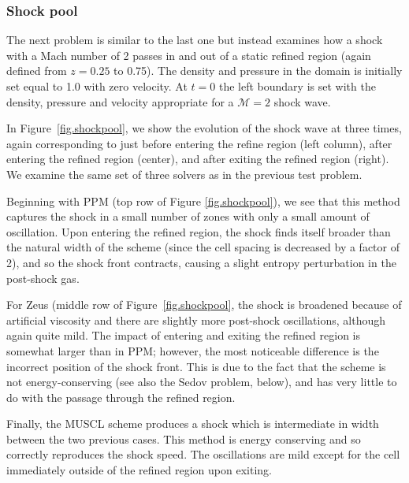 \subsubsection{Shock pool}
\label{sec.tests.shockpool}

The next problem is similar to the last one but instead examines how a shock with a Mach number of 2 passes in and out of a static refined region (again defined from $z=0.25$ to 0.75).  The density and pressure in the domain is initially set equal to 1.0 with zero velocity.  At $t=0$ the left boundary is set with the density, pressure and velocity appropriate for a $\mathcal{M}=2$ shock wave.

In Figure~\ref{fig.shockpool}, we show the evolution of the shock wave at three times, again corresponding to just before entering the refine region (left column), after entering the refined region (center), and after exiting the refined region (right).  We examine the same set of three solvers as in the previous test problem.

Beginning with PPM (top row of Figure \ref{fig.shockpool}), we see that this method captures the shock in a small number of zones with only a small amount of oscillation.  Upon entering the refined region, the shock finds itself broader than the natural width of the scheme (since the cell spacing is decreased by a factor of 2), and so the shock front contracts, causing a slight entropy perturbation in the post-shock gas. 

For Zeus (middle row of Figure~\ref{fig.shockpool}, the shock is broadened because of artificial viscosity and there are slightly more post-shock oscillations, although again quite mild.  The impact of entering and exiting the refined region is somewhat larger than in PPM; however, the most noticeable difference is the incorrect position of the shock front. This is due to the fact that the scheme is not energy-conserving (see also the Sedov problem, below), and has very little to do with the passage through the refined region.

Finally, the MUSCL scheme produces a shock which is intermediate in width between the two previous cases.  This method is energy conserving and so correctly reproduces the shock speed.  The oscillations are mild except for the cell immediately outside of the refined region upon exiting.

